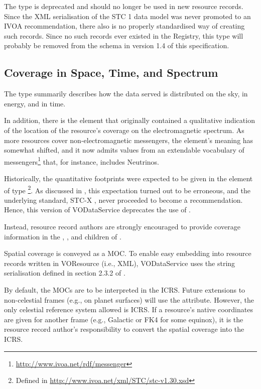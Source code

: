 \documentclass[11pt,a4paper]{ivoa}
\begin{document}
The  type is deprecated and should no longer be
used in new resource records.  Since the XML serialisation of the STC 1
data model was never promoted to an IVOA recommendation, there also is
no properly standardised way of creating such records.  Since no such
records ever existed in the Registry, this type will probably be removed
from the schema in version 1.4 of this specification.



\subsection{Coverage in Space, Time, and Spectrum}
\label{sect:cover}

The  type summarily describes how the data served is
distributed on the
sky, in energy, and in time.

In addition, there is the  element that originally
contained a qualitative indication of the location of the resource's
coverage on the electromagnetic spectrum.  As more resources cover
non-elec\-tromagnetic messengers, the element's meaning has somewhat
shifted, and it now admits values from an extendable vocabulary of
messengers\footnote{\url{http://www.ivoa.net/rdf/messenger}} that, for
instance, includes Neutrinos.

Historically, the quantitative footprints were expected to be given in
the element of type \footnote{Defined in
\url{http://www.ivoa.net/xml/STC/stc-v1.30.xsd}}.  As discussed in
\citet{note:regstc}, this expectation turned out to be erroneous,
and the underlying standard, STC-X \citep{note:stcx}, never proceeded to become
a recommendation.  Hence, this version of VODataService deprecates the
use of .

Instead, resource record authors are strongly encouraged to provide
coverage information in the , , and
 children of .

Spatial coverage is conveyed as a MOC.  To enable easy embedding into
resource records written in VOResource (i.e., XML),
VODataService uses the string serialisation defined in section 2.3.2 of
\citet{2019ivoa.spec.1007F}.

By default, the MOCs are to be interpreted in the ICRS.  Future
extensions to non-celestial frames (e.g., on planet
surfaces) will use the  attribute.
However, the only celestial reference system allowed is
ICRS.  If a resource's native coordinates are given for another frame (e.g.,
Galactic or FK4 for some equinox), it is the resource record author's
responsibility to convert the spatial coverage into the ICRS.
\end{document}
